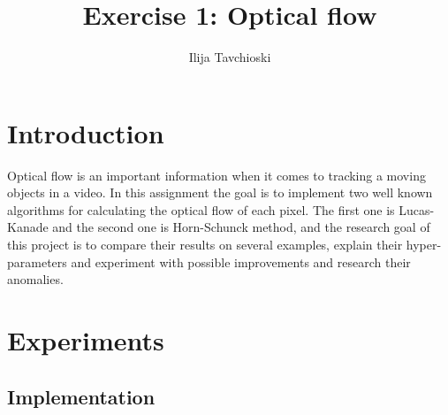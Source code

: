 \documentclass[9pt]{IEEEtran}
\title{\vspace{0ex}
Exercise 1: Optical flow}
\author{Ilija Tavchioski\vspace{-4.0ex}}
\begin{document}
\maketitle

\section{Introduction}
Optical flow is an important information when it comes to tracking a moving objects in a video. In this assignment the goal is to implement two well known algorithms for calculating the optical flow of each pixel.
The first one is Lucas-Kanade and the second one is Horn-Schunck method, and the research goal of this project is to compare their results on several examples, explain their hyper-parameters and experiment with possible improvements and research their anomalies.

\section{Experiments}
\subsection{Implementation}
\end{document}
